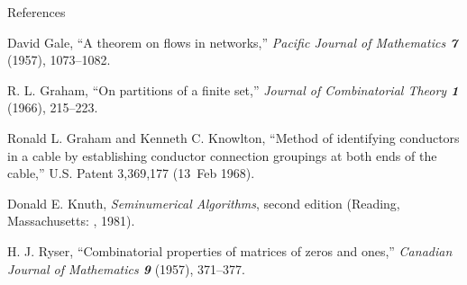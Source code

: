 \bigskip
\centerline{References}

\smallskip
\bib
[\Ga]
David Gale, ``A theorem on flows in networks,'' {\sl Pacific Journal of
Mathematics\/ \bf 7} (1957), 1073--1082.

\smallskip
\bib
[\GR]
R. L. Graham, ``On partitions of a finite set,'' {\sl Journal of Combinatorial
Theory\/ \bf 1} (1966), 215--223.

\smallskip
\bib
[\GK]
Ronald L. Graham and Kenneth C. Knowlton, ``Method of identifying conductors in
a cable by establishing conductor connection groupings at both ends of the
cable,'' U.S. Patent 3,369,177 (13~Feb 1968).

\smallskip
\bib
[\ii]
Donald E. Knuth, {\sl Seminumerical Algorithms}, second edition
(Reading, Massachusetts: \AW, 1981).

\smallskip
\bib
[\Ry]
H. J. Ryser, ``Combinatorial properties of matrices of zeros and ones,'' 
{\sl Canadian Journal of Mathematics\/ \bf 9} (1957), 371--377.

\bye

